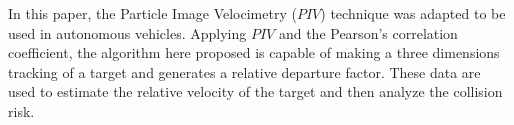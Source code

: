In this paper, the Particle Image Velocimetry ($PIV$) technique was adapted to be used in autonomous vehicles.
Applying $PIV$ and the Pearson’s correlation coefficient, the algorithm here proposed  
is capable of making a three dimensions tracking of a target
and generates a relative departure factor. These data are used to estimate the 
relative velocity of the target and then analyze the collision risk.